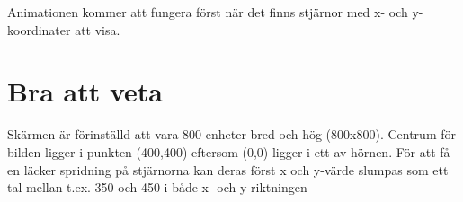 \documentclass[a4paper]{article}
\begin{document}
Animationen kommer att fungera först när det finns stjärnor med x- och y-koordinater att visa.


\section{Bra att veta}

Skärmen är förinställd att vara 800 enheter bred och hög (800x800). Centrum för bilden ligger i punkten (400,400) eftersom (0,0) ligger i ett av hörnen. För att få en läcker spridning på stjärnorna kan deras först x och y-värde slumpas som ett tal mellan t.ex. 350 och 450 i både x- och y-riktningen
\end{document}
